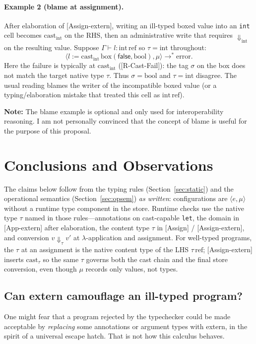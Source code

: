 \documentclass[11pt,a4paper]{article}
\begin{document}
\paragraph{Example 2 (blame at assignment).}
After elaboration of \textsf{[{Assign-extern}]}, writing an ill-typed boxed value into an \texttt{int} cell becomes $\text{cast}_{\text{int}}$ on the RHS, then an administrative write that requires $\Downarrow_{\text{int}}$ on the resulting value.
Suppose $\Gamma \vdash l : \text{int}\,\text{ref}$ so $\tau=\text{int}$ throughout:
\[
  \langle l \mathrel{:=} \text{cast}_{\text{int}}\, \text{box}(\textsf{false}, \text{bool}), \mu \rangle \to^* \text{error}.
\]
Here the failure is typically at $\text{cast}_{\text{int}}$ (\textsf{[R-Cast-Fail]}): the tag $\sigma$ on the box does not match the target native type $\tau$.
Thus $\sigma=\text{bool}$ and $\tau=\text{int}$ disagree.
The usual reading blames the writer of the incompatible boxed value (or a typing/elaboration mistake that treated this cell as $\text{int}\,\text{ref}$).

\textbf{Note:} The blame example is optional and only used for interoperability reasoning. I am not personally convinced that the concept of blame is useful for the purpose of this proposal.

\section{Conclusions and Observations}

The claims below follow from the typing rules (Section~\ref{sec:static}) and the operational semantics (Section~\ref{sec:opsem}) \emph{as written}: configurations are $\langle e, \mu \rangle$ without a runtime type component in the store.
Runtime checks use the native type $\tau$ named in those rules---annotations on cast-capable \texttt{let}, the domain in \textsf{[App-extern]} after elaboration, the content type $\tau$ in \textsf{[{Assign}]} / \textsf{[{Assign-extern}]}, and conversion $v \Downarrow_{\tau} v'$ at $\lambda$-application and assignment.
For well-typed programs, the $\tau$ at an assignment is the native content type of the LHS $\tau\,\text{ref}$; \textsf{[{Assign-extern}]} inserts $\text{cast}_{\tau}$ so the same $\tau$ governs both the cast chain and the final store conversion, even though $\mu$ records only values, not types.

\subsection{Can \textsf{extern} camouflage an ill-typed program?}
One might fear that a program rejected by the typechecker could be made acceptable by \emph{replacing} some annotations or argument types with \textsf{extern}, in the spirit of a universal escape hatch.
That is not how this calculus behaves.
\end{document}
